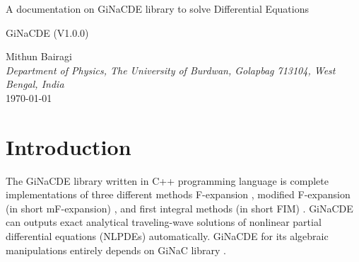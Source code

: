 \documentclass[prd,aps,floats,showkeys,nofootinbib,notitlepage]{revtex4-2}
\begin{document}
	\begin{titlepage}
		\begin{center}
			\Huge {A documentation on GiNaCDE library to solve Differential Equations} 
		\end{center}
		\vspace{3cm}
		\begin{center}
			\Large{GiNaCDE (V1.0.0)}
		\end{center}
		\vspace{2cm} 
		\begin{center} 
			Mithun Bairagi \\[3pt]  
			\textit{Department of Physics, The University of Burdwan, Golapbag 713104, West Bengal, India} \\ [1cm]
			\today
		\end{center}
	\end{titlepage}
	
	\clearpage
	
	\tableofcontents
	
	\section{Introduction}
	The GiNaCDE library written in C++ programming language is complete implementations of three different methods F-expansion \cite{fexpn024,fexpn024_1,fexpn123,0246,234}, modified F-expansion (in short mF-expansion) \cite{modfexpn}, and first integral methods (in short FIM) \cite{fim0,fim,mirza,complexTwt1}. GiNaCDE can outputs exact analytical traveling-wave solutions of nonlinear partial differential equations (NLPDEs) automatically.
	GiNaCDE for its algebraic manipulations entirely depends on GiNaC library \cite{ginac}.  
	
	
\end{document}
